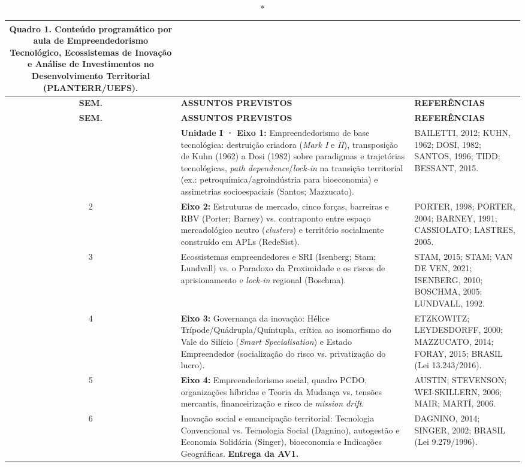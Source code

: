 \documentclass[11pt,a4paper]{article}
\begin{document}
\small
\begin{longtable}{|c|p{8.5cm}|p{5.8cm}|}
\caption*{\textbf{Quadro 1. Conteúdo programático por aula de Empreendedorismo Tecnológico, Ecossistemas de Inovação e Análise de Investimentos no Desenvolvimento Territorial (PLANTERR/UEFS).}} \\
\hline
\rowcolor{uefslight}
\textbf{SEM.} & \centering\textbf{ASSUNTOS PREVISTOS} & \textbf{REFERÊNCIAS} \\
\hline
\endfirsthead
\hline
\rowcolor{uefslight}
\textbf{SEM.} & \centering\textbf{ASSUNTOS PREVISTOS} & \textbf{REFERÊNCIAS} \\
\hline
\endhead
\hline
\endfoot
1 & \textbf{Unidade I · Eixo 1:} Empreendedorismo de base tecnológica: destruição criadora (\textit{Mark I} e \textit{II}), transposição de Kuhn (1962) a Dosi (1982) sobre paradigmas e trajetórias tecnológicas, \textit{path dependence}/\textit{lock-in} na transição territorial (ex.: petroquímica/agroindústria para bioeconomia) e assimetrias socioespaciais (Santos; Mazzucato). & BAILETTI, 2012; KUHN, 1962; DOSI, 1982; SANTOS, 1996; TIDD; BESSANT, 2015. \\
\hline
2 & \textbf{Eixo 2:} Estruturas de mercado, cinco forças, barreiras e RBV (Porter; Barney) vs. contraponto entre espaço mercadológico neutro (\textit{clusters}) e território socialmente construído em APLs (RedeSist). & PORTER, 1998; PORTER, 2004; BARNEY, 1991; CASSIOLATO; LASTRES, 2005. \\
\hline
3 & Ecossistemas empreendedores e SRI (Isenberg; Stam; Lundvall) vs. o Paradoxo da Proximidade e os riscos de aprisionamento e \textit{lock-in} regional (Boschma). & STAM, 2015; STAM; VAN DE VEN, 2021; ISENBERG, 2010; BOSCHMA, 2005; LUNDVALL, 1992. \\
\hline
4 & \textbf{Eixo 3:} Governança da inovação: Hélice Trípode/Quádrupla/Quíntupla, crítica ao isomorfismo do Vale do Silício (\textit{Smart Specialisation}) e Estado Empreendedor (socialização do risco vs. privatização do lucro). & ETZKOWITZ; LEYDESDORFF, 2000; MAZZUCATO, 2014; FORAY, 2015; BRASIL (Lei 13.243/2016). \\
\hline
5 & \textbf{Eixo 4:} Empreendedorismo social, quadro PCDO, organizações híbridas e Teoria da Mudança vs. tensões mercantis, financeirização e risco de \textit{mission drift}. & AUSTIN; STEVENSON; WEI-SKILLERN, 2006; MAIR; MARTÍ, 2006. \\
\hline
6 & Inovação social e emancipação territorial: Tecnologia Convencional vs. Tecnologia Social (Dagnino), autogestão e Economia Solidária (Singer), bioeconomia e Indicações Geográficas. \textbf{Entrega da AV1.} & DAGNINO, 2014; SINGER, 2002; BRASIL (Lei 9.279/1996). \\

\end{longtable}
\end{document}
